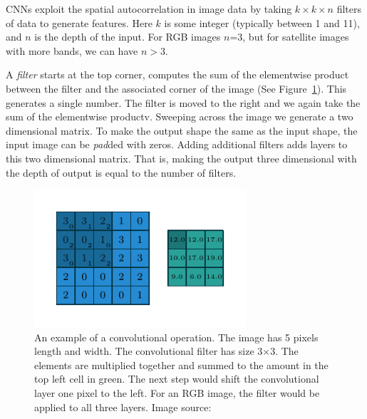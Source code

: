 \documentclass[12pt, a4paper, oneside, headinclude, footinclude]{article}
\begin{document}
CNNs exploit the spatial autocorrelation in image data by taking $k\times k
\times n$ filters of data to generate features.  Here $k$ is some
integer (typically between 1 and 11), and $n$ is the depth of the input. For
RGB images $n$=3, but for satellite images with more bands, we can have $n>3$. 


A \textit{filter} starts at the top corner, computes the sum of the elementwise product
between the filter and the associated corner of the image (See
Figure~\ref{fig:convolution}). This generates a single number. The filter is
moved to the right and we again take the sum of the elementwise productv.
Sweeping across the image we generate a two dimensional matrix. To make the
output shape the same as the input shape, the input image can be
\textit{pad}ded with zeros.  Adding additional filters adds layers to this two
dimensional matrix. That is, making the output three dimensional with the depth of
output is equal to the number of filters.


\begin{figure}
	\centering
    \includegraphics[width=0.7\textwidth]{numerical_no_padding_no_strides_00.pdf}
    \caption[A convolutional operation] {An example of a convolutional
    operation. The image has 5 pixels length and width. The convolutional
    filter has size 3$\times$3. The elements are multiplied together and
    summed to the amount in the top left cell in green. The next step would
    shift the convolutional layer one pixel to the left. For an RGB image, the
    filter would be applied to all three layers. Image source:
    ~\cite{dumoulin2016guide}\label{fig:convolution}}
\end{figure}
\end{document}
